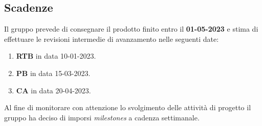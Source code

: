 \subsection{Scadenze}\label{section:scadenze}

Il gruppo prevede di consegnare il prodotto finito entro il \textbf{01-05-2023} e stima di effettuare
le revisioni intermedie di avanzamento nelle seguenti date:

\begin{enumerate}
    \item \textbf{RTB} in data 10-01-2023.
    \item \textbf{PB} in data 15-03-2023.
    \item \textbf{CA} in data 20-04-2023.
\end{enumerate}

Al fine di monitorare con attenzione lo svolgimento delle attività di progetto il gruppo ha deciso di
imporsi \textit{milestones} a cadenza settimanale.